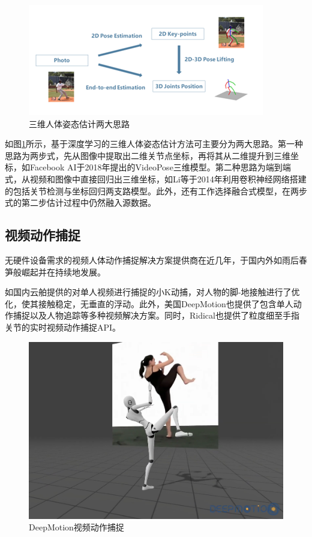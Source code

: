 \begin{figure}[h]
	\centering
	\includegraphics[scale=1]{figures/6.png}
	\caption{三维人体姿态估计两大思路}
	\label{fig:f6}
\end{figure}

如图\ref{fig:f6}所示，基于深度学习的三维人体姿态估计方法可主要分为两大思路。第一种思路为两步式，先从图像中提取出二维关节点坐标，再将其从二维提升到三维坐标，如Facebook AI于2018年提出的VideoPose三维模型。第二种思路为端到端式，从视频和图像中直接回归出三维坐标，如Li等于2014年利用卷积神经网络搭建的包括关节检测与坐标回归两支路模型。此外，还有工作选择融合式模型，在两步式的第二步估计过程中仍然融入源数据。

\subsection{视频动作捕捉}{}
无硬件设备需求的视频人体动作捕捉解决方案提供商在近几年，于国内外如雨后春笋般崛起并在持续地发展。

如国内云舶提供的对单人视频进行捕捉的小K动捕，对人物的脚-地接触进行了优化，使其接触稳定，无垂直的浮动。此外，美国DeepMotion也提供了包含单人动作捕捉以及人物追踪等多种视频解决方案。同时，Ridical也提供了粒度细至手指关节的实时视频动作捕捉API。

\begin{figure}[h]
	\centering
	\includegraphics[scale=0.4]{figures/7.png}
	\caption{DeepMotion视频动作捕捉}
	\label{fig:f7}
\end{figure}



